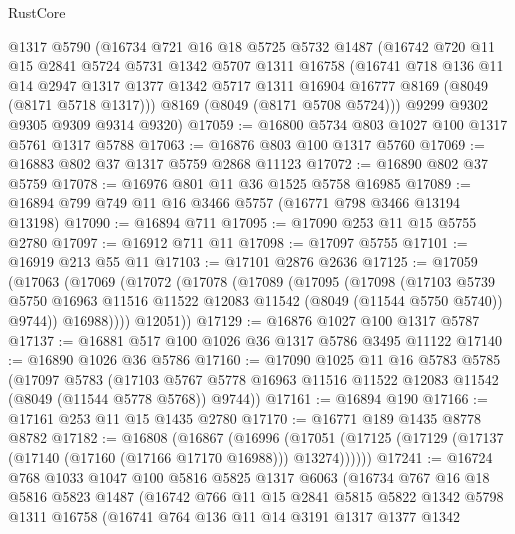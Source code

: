 \begin{lexlean}{RustCore}
\begin{coremodule}
    @1317
    @5790
    (@16734
      @721
      @16
      @18
      @5725
      @5732
      @1487
      (@16742
        @720
        @11
        @15
        @2841
        @5724
        @5731
        @1342
        @5707
        @1311
        @16758
        (@16741
          @718
          @136
          @11
          @14
          @2947
          @1317
          @1377
          @1342
          @5717
          @1311
          @16904
          @16777
          @8169
          (@8049 (@8171 @5718 @1317)))
        @8169
        (@8049 (@8171 @5708 @5724)))
      @9299
      @9302
      @9305
      @9309
      @9314
      @9320)
@17059 := @16800 @5734 @803 @1027 @100 @1317 @5761 @1317 @5788
@17063 := @16876 @803 @100 @1317 @5760
@17069 := @16883 @802 @37 @1317 @5759 @2868 @11123
@17072 := @16890 @802 @37 @5759
@17078 := @16976 @801 @11 @36 @1525 @5758 @16985
@17089 := @16894 @799 @749 @11 @16 @3466 @5757 (@16771 @798 @3466 @13194 @13198)
@17090 := @16894 @711
@17095 := @17090 @253 @11 @15 @5755 @2780
@17097 := @16912 @711 @11
@17098 := @17097 @5755
@17101 := @16919 @213 @55 @11
@17103 := @17101 @2876 @2636
@17125 := @17059
    (@17063
      (@17069
        (@17072
          (@17078
            (@17089
              (@17095
                (@17098
                  (@17103
                    @5739
                    @5750
                    @16963
                    @11516
                    @11522
                    @12083
                    @11542
                    (@8049 (@11544 @5750 @5740))
                    @9744))
                @16988))))
        @12051))
@17129 := @16876 @1027 @100 @1317 @5787
@17137 := @16881 @517 @100 @1026 @36 @1317 @5786 @3495 @11122
@17140 := @16890 @1026 @36 @5786
@17160 := @17090
    @1025
    @11
    @16
    @5783
    @5785
    (@17097
      @5783
      (@17103 @5767 @5778 @16963 @11516 @11522 @12083 @11542 (@8049 (@11544 @5778 @5768)) @9744))
@17161 := @16894 @190
@17166 := @17161 @253 @11 @15 @1435 @2780
@17170 := @16771 @189 @1435 @8778 @8782
@17182 := @16808
    (@16867
      (@16996 (@17051 (@17125 (@17129 (@17137 (@17140 (@17160 (@17166 @17170 @16988))) @13274))))))
@17241 := @16724
    @768
    @1033
    @1047
    @100
    @5816
    @5825
    @1317
    @6063
    (@16734
      @767
      @16
      @18
      @5816
      @5823
      @1487
      (@16742
        @766
        @11
        @15
        @2841
        @5815
        @5822
        @1342
        @5798
        @1311
        @16758
        (@16741
          @764
          @136
          @11
          @14
          @3191
          @1317
          @1377
          @1342

\end{coremodule}
\end{lexlean}

